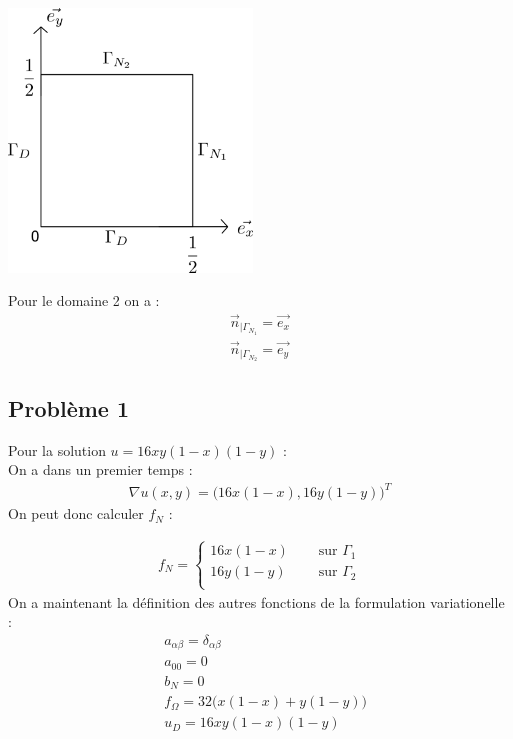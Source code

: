 \documentclass[a4paper, 12pt, french]{report}
\begin{document}
\begin{center}
    \includegraphics[height=7cm]{../Images/domaine2.png}
\end{center}

Pour le domaine 2 on a :
\begin{align*}
    \Vec{n}_{|\Gamma_{N_1}} = \Vec{e_x}\\ \Vec{n}_{|\Gamma_{N_2}}= \Vec{e_y}
\end{align*}


\subsection{Problème 1}
\label{D2P1}

Pour la solution $u=16xy(1-x)(1-y)$ :\\
On a dans un premier temps :
\begin{align*}
    \nabla u(x,y) = \Big( 16x(1-x),16y(1-y) \Big)^T
\end{align*}
On peut donc calculer $f_N$ : 

\begin{align*}
    f_N = \left\{
    \begin{array}{ll}
        16x(1-x)  \quad &\text{ sur $\Gamma_1$}\\
        16y(1-y)\quad &\text{ sur $\Gamma_2$}\\
    \end{array}
    \right.
\end{align*}
On a maintenant la définition des autres fonctions de la formulation variationelle :
\begin{align*}
    &a_{\alpha\beta} = \delta_{\alpha\beta}\\
    &a_{00} = 0\\
    &b_N = 0\\
    &f_\Omega = 32\big( x(1-x) + y(1-y) \big)\\
    &u_D = 16 x y (1-x)(1-y)
\end{align*}
\end{document}
